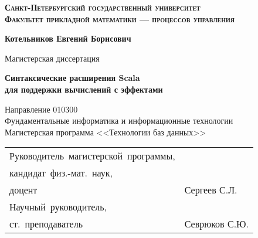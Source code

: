 \begin{titlepage}
    \begin{center}
        \normalsize{\textbf{\textsc{Санкт-Петербургский государственный университет}}}\\
        \small{\textsc{\textbf{Факультет прикладной математики --- процессов управления}}}\\
        
        \vspace{3.0em}

        \large{\textbf{Котельников Евгений Борисович}}

        \vspace{2.0em}

        \large{Магистерская диссертация}
        
        \vspace{3.0em}

        \Large{\textbf{Синтаксические расширения Scala\\для поддержки вычислений с эффектами}}
        
        \vspace{3.0em}

        \small{Направление 010300}\\
        \vspace{0.5em}
        \small{Фундаментальные информатика и информационные технологии}\\
        \vspace{0.5em}
        \small{Магистерская программа <<Технологии баз данных>>}\\

        \vspace{3.0em}

        \begin{table}[H]
            \begin{center}
                \small
                \begin{tabular}{ll}
                    Руководитель~магистерской~программы, 
                    \\
                    кандидат~физ.-мат.~наук,
                    \\
                    доцент &\hspace{7em} Сергеев С.Л.
                    
                    \\[1cm]
                    
                    Научный~руководитель,
                    \\
                    ст.~преподаватель &\hspace{7em} Севрюков С.Ю.
                    

\end{tabular}
\end{center}
\end{table}
\end{center}
\end{titlepage}
